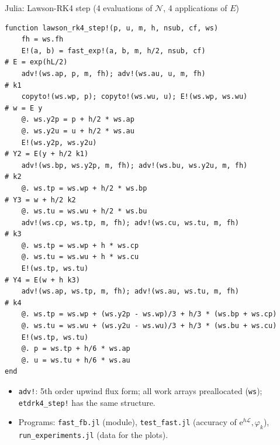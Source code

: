 \documentclass[aspectratio=169,10pt]{beamer}
\newcommand{\ee}{\mathrm{e}}
\newcommand{\LL}{\mathcal{L}}   %
\newcommand{\NN}{\mathcal{N}}   %
\newcommand{\ph}{\varphi}
\begin{document}
\begin{frame}[fragile]{Julia: Lawson-RK4 step (4 evaluations of $\NN$, 4 applications of $E$)}
\begin{lstlisting}
function lawson_rk4_step!(p, u, m, h, nsub, cf, ws)
    fh = ws.fh
    E!(a, b) = fast_exp!(a, b, m, h/2, nsub, cf)                       # E = exp(hL/2)
    adv!(ws.ap, p, m, fh); adv!(ws.au, u, m, fh)                       # k1
    copyto!(ws.wp, p); copyto!(ws.wu, u); E!(ws.wp, ws.wu)             # w = E y
    @. ws.y2p = p + h/2 * ws.ap
    @. ws.y2u = u + h/2 * ws.au
    E!(ws.y2p, ws.y2u)                                                 # Y2 = E(y + h/2 k1)
    adv!(ws.bp, ws.y2p, m, fh); adv!(ws.bu, ws.y2u, m, fh)             # k2
    @. ws.tp = ws.wp + h/2 * ws.bp                                     # Y3 = w + h/2 k2
    @. ws.tu = ws.wu + h/2 * ws.bu
    adv!(ws.cp, ws.tp, m, fh); adv!(ws.cu, ws.tu, m, fh)               # k3
    @. ws.tp = ws.wp + h * ws.cp
    @. ws.tu = ws.wu + h * ws.cu
    E!(ws.tp, ws.tu)                                                   # Y4 = E(w + h k3)
    adv!(ws.ap, ws.tp, m, fh); adv!(ws.au, ws.tu, m, fh)               # k4
    @. ws.tp = ws.wp + (ws.y2p - ws.wp)/3 + h/3 * (ws.bp + ws.cp)
    @. ws.tu = ws.wu + (ws.y2u - ws.wu)/3 + h/3 * (ws.bu + ws.cu)
    E!(ws.tp, ws.tu)
    @. p = ws.tp + h/6 * ws.ap
    @. u = ws.tu + h/6 * ws.au
end
\end{lstlisting}
  \vspace{-0.3em}
  \begin{itemize}\footnotesize
    \item \texttt{adv!}: 5th order upwind flux form; all work arrays preallocated (\texttt{ws}); \texttt{etdrk4\_step!} has the same structure.
    \item Programs: \texttt{fast\_fb.jl} (module), \texttt{test\_fast.jl} (accuracy of $\ee^{h\LL},\ph_k$), \texttt{run\_experiments.jl} (data for the plots).
  \end{itemize}
\end{frame}
\end{document}
